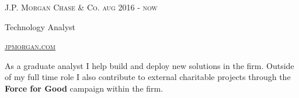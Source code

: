 {
  \textsc{\small{J.P. Morgan Chase \& Co. 
      \hfill
          {\raggedleft
              aug 2016 - now
          } \\
      }
  }
  {\raggedright\large {
   Technology Analyst 
  } \\}

  \textsc{\small\href{http://www.jpmorgan.com}{jpmorgan.com}}

  \normalsize {
    As a graduate analyst I help build and deploy new solutions in the firm. Outside of my full time role I also contribute to external charitable projects through the \textbf{Force for Good} campaign within the firm. 
  }
}